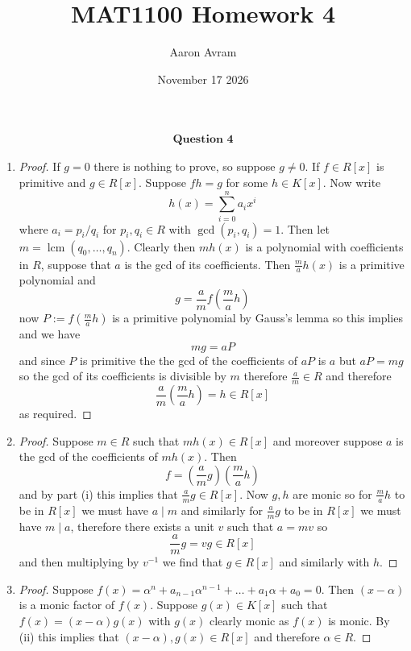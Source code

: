 \documentclass[12pt]{article}
\title{MAT1100 Homework 4}
\author{Aaron Avram}
\date{November 17 2026}
\begin{document}
\newtheorem{definition}{Definition}
\newtheorem{theorem}{Theorem}
\newtheorem{claim}{Claim}
\newtheorem{corollary}{Corollary}

\maketitle

\begin{align*}
    \textbf{Question 4}
\end{align*}

\begin{enumerate}
    \item[(i)]
    \begin{proof}
        If $g = 0$ there is nothing to prove, so suppose $g \neq 0$. If $f \in R[x]$ is primitive and $g \in R[x]$.
        Suppose $fh = g$ for some $h \in K[x]$. Now write
        \[ h(x) = \sum_{i = 0}^n a_ix^i \]
        where $a_i = p_i/q_i$ for $p_i, q_i \in R$ with $\gcd(p_i, q_i) = 1$.
        Then let $m = \operatorname{lcm}(q_0, \ldots, q_n)$. Clearly then $mh(x)$ is a polynomial with coefficients in $R$,
        suppose that $a$ is the gcd of its coefficients. Then $\frac{m}{a}h(x)$ is a primitive polynomial
        and
        \[ g = \frac{a}{m}f(\frac{m}{a}h) \]
        now $P := f(\frac{m}{a}h)$ is a primitive polynomial by Gauss's lemma so this implies
        and we have
        \[ mg = aP \]
        and since $P$ is primitive the the gcd of the coefficients of $aP$ is $a$
        but $aP = mg$ so the gcd of its coefficients is divisible by $m$ therefore $\frac{a}{m} \in R$
        and therefore
        \[ \frac{a}{m}(\frac{m}{a}h) = h \in R[x] \]
        as required.
    \end{proof}

    \item[(ii)]
    \begin{proof}
        Suppose $m \in R$
        such that $mh(x) \in R[x]$ and moreover suppose $a$ is the gcd of the coefficients
        of $mh(x)$. Then
        \[ f = (\frac{a}{m}g)(\frac{m}{a}h) \]
        and by part (i) this implies that $\frac{a}{m}g \in R[x]$.
        Now $g, h$ are monic so for $\frac{m}{a}h$ to be in $R[x]$ we must have $a \mid m$
        and similarly for $\frac{a}{m}g$ to be in $R[x]$ we must have $m \mid a$, therefore
        there exists a unit $v$ such that $a = mv$ so
        \[ \frac{a}{m}g = vg \in R[x] \]
        and then multiplying by $v^{-1}$ we find that $g \in R[x]$ and similarly with $h$.
    \end{proof}

    \item[(iii)]
    \begin{proof}
        Suppose $f(x) = \alpha^n + a_{n-1}\alpha^{n-1} + \ldots + a_1\alpha + a_0 = 0$.
        Then $(x - \alpha)$ is a monic factor of $f(x)$. Suppose $g(x) \in K[x]$
        such that $f(x) = (x - \alpha)g(x)$ with $g(x)$ clearly monic as $f(x)$ is monic.
        By (ii) this implies that $(x - \alpha), g(x) \in R[x]$ and therefore $\alpha \in R$.

    \end{proof}
\end{enumerate}
\end{document}
